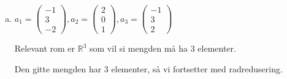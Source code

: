 \documentclass{article}
\newcommand{\vect}[1]{\begin{pmatrix} #1 \end{pmatrix}}
\newcommand{\uu}[1]{\underline{\underline{#1}}}
\newcommand{\lra}{\leftrightarrow}
\newcommand{\eqqto}[1]{\overset{\substack{#1}}{\sim}}
\begin{document}
\begin{enumerate}[a)]
Relevant rom er $\mathbb{R}^2$ som vil si mengden må ha 2 elementer.

Den gitte mengden har 2 elementer, så vi fortsetter med radredusering.

\vspace{1em}

\(
(a_1|a_2)=
\begin{pmatrix}[c|c]
-1&4\\
1&2
\end{pmatrix}
\eqqto{I+II}
\begin{pmatrix}[c|c]
0&6\\
1&2
\end{pmatrix}
\eqqto{I \lra II}
\begin{pmatrix}[c|c]
1&2\\
0&6
\end{pmatrix}
\eqqto{I-\frac{1}{3}II}
\begin{pmatrix}[c|c]
1&0\\
0&6
\end{pmatrix}
\eqqto{\frac{1}{6}II}
\begin{pmatrix}[c|c]
1&0\\
0&1
\end{pmatrix}
\)
\vspace{1em}

Vi kan se $\{a_1, a_2\}$ er lineært uavhengige, og dermed, \uu{$\{a_1, a_2\} \text{ er en basis for } \mathbb{R}^2$} - Ja


\newpage
\item \(
a_1=\vect{-1\\3\\-2},
a_2=\vect{2\\0\\1},
a_3=\vect{-1\\3\\2}
\)

\vspace{1em}

Relevant rom er $\mathbb{R}^3$ som vil si mengden må ha 3 elementer.

Den gitte mengden har 3 elementer, så vi fortsetter med radredusering.

\vspace{1em}


\end{enumerate}
\end{document}
